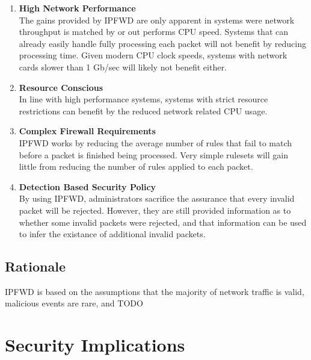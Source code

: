 \documentclass[journal]{IEEEtran}
\begin{document}
\begin{enumerate}
    \item \textbf{High Network Performance}\\
      The gains provided by IPFWD are only apparent in systems were network
      throughput is matched by or out performs CPU speed. Systems that can
      already easily handle fully processing each packet will not benefit by
      reducing processing time. Given modern CPU clock speeds, systems with
      network cards slower than 1 Gb/sec will likely not benefit either.

    \item \textbf{Resource Conscious}\\
      In line with high performance systems, systems with strict resource
      restrictions can benefit by the reduced network related CPU usage.

    \item \textbf{Complex Firewall Requirements}\\
      IPFWD works by reducing the average number of rules that fail to match
      before a packet is finished being processed. Very simple rulesets will
      gain little from reducing the number of rules applied to each packet.

    \item \textbf{Detection Based Security Policy}\\ 
      By using IPFWD, administrators sacrifice the assurance that every invalid
      packet will be rejected.  However, they are still provided information as
      to whether some invalid packets were rejected, and that information can
      be used to infer the existance of additional invalid packets. 

\end{enumerate}


\subsection{Rationale}
IPFWD is based on the assumptions that the majority of network traffic is
valid, malicious events are rare, and TODO


\section{Security Implications}


\end{document}
